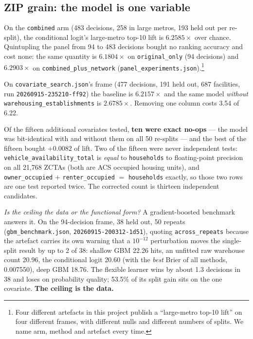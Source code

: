 \documentclass[conference]{IEEEtran}
\begin{document}
\subsection{ZIP grain: the model is one variable}

On the \texttt{combined} arm (483 decisions, 258 in large metros, 193 held out
per re-split), the conditional logit's large-metro top-10 lift is
$6.2585\times$ over chance. Quintupling the panel from 94 to 483 decisions
bought no ranking accuracy and cost none: the same quantity is $6.1804\times$
on \texttt{original\_only} (94 decisions) and $6.2903\times$ on
\texttt{combined\_plus\_network}
(\texttt{panel\_experiments.json}).\footnote{Four different artefacts in this
project publish a ``large-metro top-10 lift'' on four different frames, with
different nulls and different numbers of splits. We name arm, method and
artefact every time.}

On \texttt{covariate\_search.json}'s frame (477 decisions, 191 held out,
687 facilities, run \texttt{20260915-235210-ff92}) the baseline is
$6.2157\times$ and the same model \emph{without}
\texttt{warehousing\_establishments} is $2.6785\times$. Removing one column
costs 3.54 of 6.22.

Of the fifteen additional covariates tested, \textbf{ten were exact no-ops} ---
the model was bit-identical with and without them on all 50 re-splits --- and
the best of the fifteen bought $+0.0082$ of lift. Two of the fifteen were
never independent tests: \texttt{vehicle\_availability\_total} is
\emph{equal} to \texttt{households} to floating-point precision on all 21{,}768
ZCTAs (both are ACS occupied housing units), and
\texttt{owner\_occupied} $+$ \texttt{renter\_occupied} $=$
\texttt{households} exactly, so those two rows are one test reported twice.
The corrected count is thirteen independent candidates.

\emph{Is the ceiling the data or the functional form?} A gradient-boosted
benchmark answers it. On the 94-decision frame, 38 held out, 50 repeats
(\texttt{gbm\_benchmark.json}, \texttt{20260915-200312-1d51}), quoting
\texttt{across\_repeats} because the artefact carries its own warning that a
$10^{-12}$ perturbation moves the single-split result by up to 2 of 38:
shallow GBM 22.26 hits, an unfitted raw warehouse count 20.96, the conditional
logit 20.60 (with the \emph{best} Brier of all methods, 0.007550), deep GBM
18.76. The flexible learner wins by about 1.3 decisions in 38 and loses on
probability quality; 53.5\% of its split gain sits on the one covariate.
\textbf{The ceiling is the data.}
\end{document}
